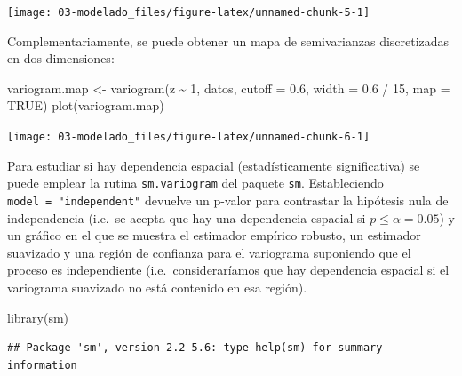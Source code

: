 \documentclass[
  spanish,
]{book}
\newenvironment{Shaded}{\begin{snugshade}}{\end{snugshade}}
\newcommand{\AttributeTok}[1]{\textcolor[rgb]{0.77,0.63,0.00}{#1}}
\newcommand{\ConstantTok}[1]{\textcolor[rgb]{0.00,0.00,0.00}{#1}}
\newcommand{\DecValTok}[1]{\textcolor[rgb]{0.00,0.00,0.81}{#1}}
\newcommand{\FloatTok}[1]{\textcolor[rgb]{0.00,0.00,0.81}{#1}}
\newcommand{\FunctionTok}[1]{\textcolor[rgb]{0.00,0.00,0.00}{#1}}
\newcommand{\NormalTok}[1]{#1}
\newcommand{\OtherTok}[1]{\textcolor[rgb]{0.56,0.35,0.01}{#1}}
\newcommand{\SpecialCharTok}[1]{\textcolor[rgb]{0.00,0.00,0.00}{#1}}
\newcommand{\StringTok}[1]{\textcolor[rgb]{0.31,0.60,0.02}{#1}}
\theoremstyle{break}
\theoremstyle{definition}
\theoremstyle{definition}
\theoremstyle{definition}
\theoremstyle{definition}
\theoremstyle{remark}
\begin{document}
\begin{center}\texttt{[image: 03-modelado\_files/figure-latex/unnamed-chunk-5-1]} \end{center}

Complementariamente, se puede obtener un mapa de semivarianzas discretizadas en dos dimensiones:

\begin{Shaded}
\begin{Highlighting}[]
\NormalTok{variogram.map }\OtherTok{\textless{}{-}} \FunctionTok{variogram}\NormalTok{(z }\SpecialCharTok{\textasciitilde{}} \DecValTok{1}\NormalTok{, datos, }\AttributeTok{cutoff =} \FloatTok{0.6}\NormalTok{, }\AttributeTok{width =} \FloatTok{0.6} \SpecialCharTok{/} \DecValTok{15}\NormalTok{, }\AttributeTok{map =} \ConstantTok{TRUE}\NormalTok{)}
\FunctionTok{plot}\NormalTok{(variogram.map)}
\end{Highlighting}
\end{Shaded}

\begin{center}\texttt{[image: 03-modelado\_files/figure-latex/unnamed-chunk-6-1]} \end{center}

Para estudiar si hay dependencia espacial (estadísticamente significativa) se puede emplear la rutina \texttt{sm.variogram} del paquete \texttt{sm}.
Estableciendo \texttt{model\ =\ "independent"} devuelve un p-valor para contrastar la hipótesis nula de independencia
(i.e.~se acepta que hay una dependencia espacial si \(p \leq \alpha = 0.05\)) y un gráfico en el que se muestra el estimador empírico robusto, un estimador suavizado y una región de confianza para el variograma suponiendo que el proceso es independiente (i.e.~consideraríamos que hay dependencia espacial si el variograma suavizado no está contenido en esa región).

\begin{Shaded}
\begin{Highlighting}[]
\FunctionTok{library}\NormalTok{(sm)}
\end{Highlighting}
\end{Shaded}

\begin{verbatim}
## Package 'sm', version 2.2-5.6: type help(sm) for summary information
\end{verbatim}

\begin{Shaded}
\end{Shaded}
\end{document}
